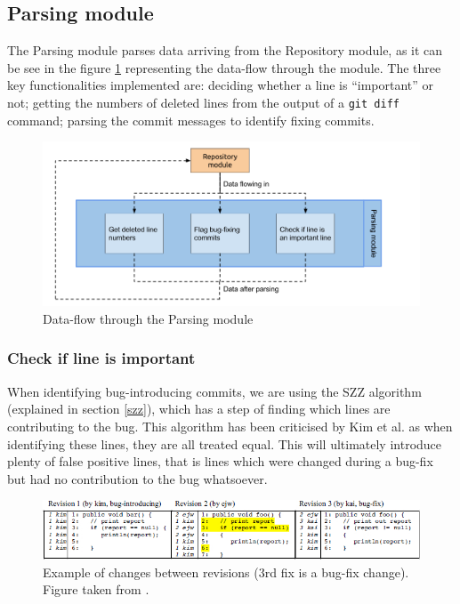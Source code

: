 \documentclass[12pt,twoside,notitlepage]{report}
\begin{document}
\subsection{Parsing module}\label{parsing}
The Parsing module parses data arriving from the Repository module, as it can be see in the figure \ref{parsing_module} representing the data-flow through the module. The three key functionalities implemented are: deciding whether a line is ``important'' or not; getting the numbers of deleted lines from the output of a \texttt{git diff} command; parsing the commit messages to identify fixing commits. 
\begin{figure}[h]
\includegraphics[width=1.0\textwidth]{parsing_module.png}
\caption{Data-flow through the Parsing module}

\label{parsing_module}
\end{figure}
\subsubsection*{Check if line is important}
When identifying bug-introducing commits, we are using the SZZ algorithm (explained in section \ref{szz}), which has a step of finding which lines are contributing to the bug. This algorithm has been criticised by Kim et al. \cite{KimZim} as when identifying these lines, they are all treated equal. This will ultimately introduce plenty of false positive lines, that is lines which were changed during a bug-fix but had no contribution to the bug whatsoever.
\begin{figure}[h]
\includegraphics[width=1.0\textwidth]{automatic_identification.jpg}
\caption[Example of changes between revisions.]{Example of changes between revisions (3rd fix is a bug-fix change). Figure taken from \cite{KimZim}.}
\label{automatic_identification}
\end{figure}
\end{document}
